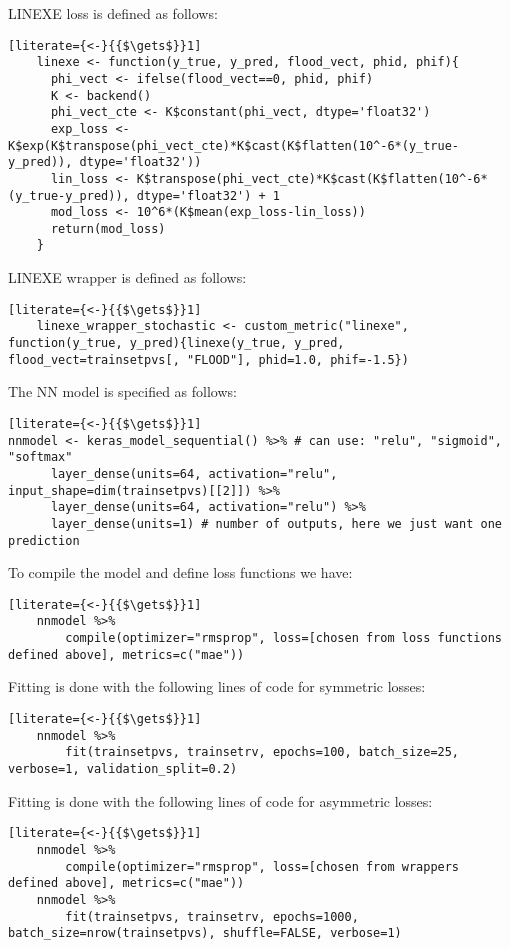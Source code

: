 LINEXE loss is defined as follows:
\begin{lstlisting}[literate={<-}{{$\gets$}}1]
	linexe <- function(y_true, y_pred, flood_vect, phid, phif){
	  phi_vect <- ifelse(flood_vect==0, phid, phif)
	  K <- backend()
	  phi_vect_cte <- K$constant(phi_vect, dtype='float32')
	  exp_loss <- K$exp(K$transpose(phi_vect_cte)*K$cast(K$flatten(10^-6*(y_true-y_pred)), dtype='float32'))
	  lin_loss <- K$transpose(phi_vect_cte)*K$cast(K$flatten(10^-6*(y_true-y_pred)), dtype='float32') + 1
	  mod_loss <- 10^6*(K$mean(exp_loss-lin_loss))
	  return(mod_loss) 
	}
\end{lstlisting}

LINEXE wrapper is defined as follows:
\begin{lstlisting}[literate={<-}{{$\gets$}}1]
	linexe_wrapper_stochastic <- custom_metric("linexe", function(y_true, y_pred){linexe(y_true, y_pred, flood_vect=trainsetpvs[, "FLOOD"], phid=1.0, phif=-1.5})
\end{lstlisting}

The NN model is specified as follows:
\begin{lstlisting}[literate={<-}{{$\gets$}}1]
nnmodel <- keras_model_sequential() %>% # can use: "relu", "sigmoid", "softmax"
      layer_dense(units=64, activation="relu", input_shape=dim(trainsetpvs)[[2]]) %>%
      layer_dense(units=64, activation="relu") %>%
      layer_dense(units=1) # number of outputs, here we just want one prediction
\end{lstlisting}

To compile the model and define loss functions we have:
\begin{lstlisting}[literate={<-}{{$\gets$}}1]
	nnmodel %>% 
		compile(optimizer="rmsprop", loss=[chosen from loss functions defined above], metrics=c("mae"))
\end{lstlisting}

Fitting is done with the following lines of code for symmetric losses:
\begin{lstlisting}[literate={<-}{{$\gets$}}1]
	nnmodel %>% 
		fit(trainsetpvs, trainsetrv, epochs=100, batch_size=25, verbose=1, validation_split=0.2)
\end{lstlisting}

Fitting is done with the following lines of code for asymmetric losses:
\begin{lstlisting}[literate={<-}{{$\gets$}}1]
	nnmodel %>% 
		compile(optimizer="rmsprop", loss=[chosen from wrappers defined above], metrics=c("mae"))
	nnmodel %>% 
		fit(trainsetpvs, trainsetrv, epochs=1000, batch_size=nrow(trainsetpvs), shuffle=FALSE, verbose=1)
\end{lstlisting}

